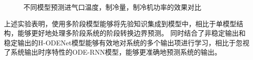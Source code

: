 \begin{figure}
\caption{不同模型预测进气口温度，制冷量，制冷机功率的效果对比} %
\label{fig:models}  %
\end{figure}
上述实验表明，使用多阶段模型能够将先验知识集成到模型中，相比于单模型结构，能够更好地处理多阶段系统的阶段转换边界预测。
同时结合了非稳定输出和稳定输出的H-ODENet模型能够有效地对系统的多个输出项进行学习，相比于忽视了系统输出时序特性的ODE-RNN模型，能够更准确地预测系统的输出。

